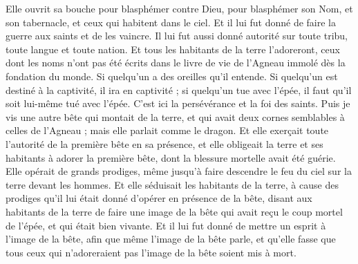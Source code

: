 \begin{multicols}{2}
Elle ouvrit sa bouche pour blasphémer contre Dieu, pour blasphémer son Nom, et son tabernacle, et ceux qui habitent dans le ciel.
Et il lui fut donné de faire la guerre aux saints et de les vaincre. Il lui fut aussi donné autorité sur toute tribu, toute langue et toute nation.
Et tous les habitants de la terre l'adoreront, ceux dont les noms n'ont pas été écrits dans le livre de vie de l'Agneau immolé dès la fondation du monde.
Si quelqu'un a des oreilles qu'il entende.
Si quelqu'un est destiné à la captivité, il ira en captivité ; si quelqu'un tue avec l'épée, il faut qu'il soit lui-même tué avec l'épée. C'est ici la persévérance et la foi des saints.
Puis je vis une autre bête qui montait de la terre, et qui avait deux cornes semblables à celles de l'Agneau ; mais elle parlait comme le dragon.
Et elle exerçait toute l'autorité de la première bête en sa présence, et elle obligeait la terre et ses habitants à adorer la première bête, dont la blessure mortelle avait été guérie.
Elle opérait de grands prodiges, même jusqu'à faire descendre le feu du ciel sur la terre devant les hommes.
Et elle séduisait les habitants de la terre, à cause des prodiges qu'il lui était donné d'opérer en présence de la bête, disant aux habitants de la terre de faire une image de la bête qui avait reçu le coup mortel de l'épée, et qui était bien vivante.
Et il lui fut donné de mettre un esprit à l'image de la bête, afin que même l'image de la bête parle, et qu'elle fasse que tous ceux qui n'adoreraient pas l'image de la bête soient mis à mort.

\end{multicols}
